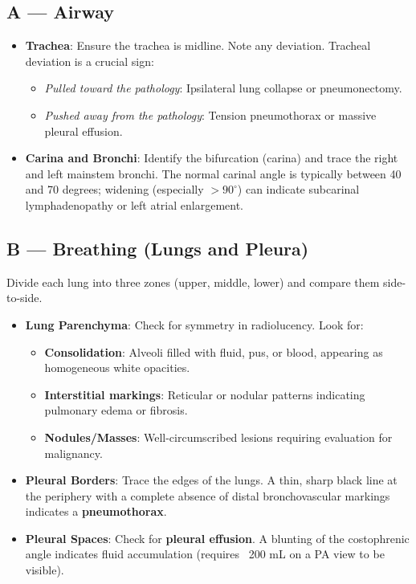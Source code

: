 \subsection*{A --- Airway}
\begin{itemize}
    \item \textbf{Trachea}: Ensure the trachea is midline. Note any deviation. Tracheal deviation is a crucial sign:
    \begin{itemize}
        \item \textit{Pulled toward the pathology}: Ipsilateral lung collapse or pneumonectomy.
        \item \textit{Pushed away from the pathology}: Tension pneumothorax or massive pleural effusion.
    \end{itemize}
    \item \textbf{Carina and Bronchi}: Identify the bifurcation (carina) and trace the right and left mainstem bronchi. The normal carinal angle is typically between 40 and 70 degrees; widening (especially $>90^\circ$) can indicate subcarinal lymphadenopathy or left atrial enlargement.
\end{itemize}

\subsection*{B --- Breathing (Lungs and Pleura)}
Divide each lung into three zones (upper, middle, lower) and compare them side-to-side.
\begin{itemize}
    \item \textbf{Lung Parenchyma}: Check for symmetry in radiolucency. Look for:
    \begin{itemize}
        \item \textbf{Consolidation}: Alveoli filled with fluid, pus, or blood, appearing as homogeneous white opacities.
        \item \textbf{Interstitial markings}: Reticular or nodular patterns indicating pulmonary edema or fibrosis.
        \item \textbf{Nodules/Masses}: Well-circumscribed lesions requiring evaluation for malignancy.
    \end{itemize}
    \item \textbf{Pleural Borders}: Trace the edges of the lungs. A thin, sharp black line at the periphery with a complete absence of distal bronchovascular markings indicates a \textbf{pneumothorax}.
    \item \textbf{Pleural Spaces}: Check for \textbf{pleural effusion}. A blunting of the costophrenic angle indicates fluid accumulation (requires ~200 mL on a PA view to be visible).
\end{itemize}

